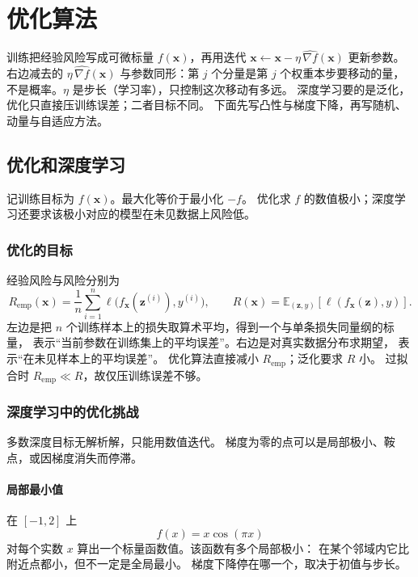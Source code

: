 \chapter{优化算法}

训练把经验风险写成可微标量 $f(\bm{x})$，再用迭代
$\bm{x}\leftarrow\bm{x}-\eta\,\widehat{\nabla f}(\bm{x})$ 更新参数。
右边减去的 $\eta\,\widehat{\nabla f}(\bm{x})$ 与参数同形：第 $j$ 个分量是第 $j$ 个权重本步要移动的量，
不是概率。$\eta$ 是步长（学习率），只控制这次移动有多远。
深度学习要的是泛化，优化只直接压训练误差；二者目标不同。
下面先写凸性与梯度下降，再写随机、动量与自适应方法。

\section{优化和深度学习}

记训练目标为 $f(\bm{x})$。最大化等价于最小化 $-f$。
优化求 $f$ 的数值极小；深度学习还要求该极小对应的模型在未见数据上风险低。

\subsection{优化的目标}

经验风险与风险分别为
\[
R_{\mathrm{emp}}(\bm{x})
=
\frac{1}{n}\sum_{i=1}^{n}\ell\bigl(f_{\bm{x}}(\bm{z}^{(i)}),y^{(i)}\bigr),
\qquad
R(\bm{x})
=
\mathbb{E}_{(\bm{z},y)}[\ell(f_{\bm{x}}(\bm{z}),y)].
\]
左边是把 $n$ 个训练样本上的损失取算术平均，得到一个与单条损失同量纲的标量，
表示“当前参数在训练集上的平均误差”。右边是对真实数据分布求期望，
表示“在未见样本上的平均误差”。
优化算法直接减小 $R_{\mathrm{emp}}$；泛化要求 $R$ 小。
过拟合时 $R_{\mathrm{emp}}\ll R$，故仅压训练误差不够。

\subsection{深度学习中的优化挑战}

多数深度目标无解析解，只能用数值迭代。
梯度为零的点可以是局部极小、鞍点，或因梯度消失而停滞。

\subsubsection{局部最小值}

在 $[-1,2]$ 上
\[
f(x)=x\cos(\pi x)
\]
对每个实数 $x$ 算出一个标量函数值。该函数有多个局部极小：
在某个邻域内它比附近点都小，但不一定是全局最小。
梯度下降停在哪一个，取决于初值与步长。

